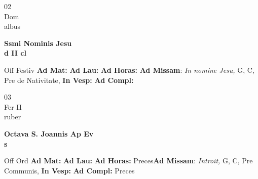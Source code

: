 \documentclass[10pt, openany]{book}
\begin{document}
        \begin{center}
            \begin{minipage}{3.5in}
                \vspace{2em}
                \begin{minipage}{0.5in}
                    {\Huge 02} \\
                    {\normalsize Dom} \\
                    {\normalsize albus}
                \end{minipage}
                \begin{minipage}{3.0in}
                    \textbf{ \large Ssmi Nominis Jesu \\
                    \textnormal{\normalsize d II cl}} \\ 
                \end{minipage}
                \begin{justify}Off Festiv
                    \textbf{Ad Mat: }
                    \textbf{Ad Lau: }
                    \textbf{Ad Horas: }\textbf{Ad Missam}: \textit{In nomine Jesu,} G, C, Pre de Nativitate,  
                    \textbf{In Vesp: }
                    \textbf{Ad Compl: }
                \end{justify}
            \end{minipage}
        \end{center}
    
        \begin{center}
            \begin{minipage}{3.5in}
                \vspace{2em}
                \begin{minipage}{0.5in}
                    {\Huge 03} \\
                    {\normalsize Fer II} \\
                    {\normalsize ruber}
                \end{minipage}
                \begin{minipage}{3.0in}
                    \textbf{ \large Octava S. Joannis Ap Ev \\
                    \textnormal{\normalsize s}} \\ 
                \end{minipage}
                \begin{justify}Off Ord
                    \textbf{Ad Mat: }
                    \textbf{Ad Lau: }
                    \textbf{Ad Horas: }Preces\textbf{Ad Missam}: \textit{Introit,} G, C, Pre Communis,  
                    \textbf{In Vesp: }
                    \textbf{Ad Compl: }Preces
                \end{justify}
            \end{minipage}
        \end{center}
    
\end{document}
